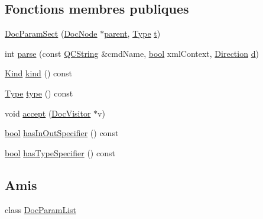 \subsection*{Fonctions membres publiques}
\begin{DoxyCompactItemize}
\item 
\hyperlink{class_doc_param_sect_aeb6f093d845b9b44fde36c0fe85d916b}{Doc\+Param\+Sect} (\hyperlink{class_doc_node}{Doc\+Node} $\ast$\hyperlink{class_doc_node_a990d8b983962776a647e6231d38bd329}{parent}, \hyperlink{class_doc_param_sect_a402e8723e8b9f22c5ffa84046224d51a}{Type} \hyperlink{058__bracket__recursion_8tcl_a69e959f6901827e4d8271aeaa5fba0fc}{t})
\item 
int \hyperlink{class_doc_param_sect_a626fe5b50a6117fb4d1149ff67ff249d}{parse} (const \hyperlink{class_q_c_string}{Q\+C\+String} \&cmd\+Name, \hyperlink{qglobal_8h_a1062901a7428fdd9c7f180f5e01ea056}{bool} xml\+Context, \hyperlink{class_doc_param_sect_ad5e3f053f03f8c333a69208521075c66}{Direction} \hyperlink{060__command__switch_8tcl_af43f4b1f0064a33b2d662af9f06d3a00}{d})
\item 
\hyperlink{class_doc_node_aebd16e89ca590d84cbd40543ea5faadb}{Kind} \hyperlink{class_doc_param_sect_a735fe99dbbbb6747bf1afe89590ee5db}{kind} () const 
\item 
\hyperlink{class_doc_param_sect_a402e8723e8b9f22c5ffa84046224d51a}{Type} \hyperlink{class_doc_param_sect_a048ff67afd91b452c2999d21b9ab97e9}{type} () const 
\item 
void \hyperlink{class_doc_param_sect_a8d62e64afbf83c9397c5479ffcacebd2}{accept} (\hyperlink{class_doc_visitor}{Doc\+Visitor} $\ast$v)
\item 
\hyperlink{qglobal_8h_a1062901a7428fdd9c7f180f5e01ea056}{bool} \hyperlink{class_doc_param_sect_aa345cd4f505dc1a5162e09ef12b23e06}{has\+In\+Out\+Specifier} () const 
\item 
\hyperlink{qglobal_8h_a1062901a7428fdd9c7f180f5e01ea056}{bool} \hyperlink{class_doc_param_sect_aabd881522cc98b4e5b75fd8fadbe7a82}{has\+Type\+Specifier} () const 
\end{DoxyCompactItemize}
\subsection*{Amis}
\begin{DoxyCompactItemize}
\item 
class \hyperlink{class_doc_param_sect_a8d559bee17ecf9f9dc8f39029d78e567}{Doc\+Param\+List}
\end{DoxyCompactItemize}
